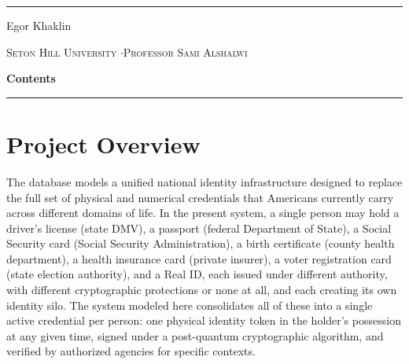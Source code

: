 \documentclass[11pt,letterpaper]{article}
\begin{document}
\begin{titlepage}
\begin{center}
\vspace{0.7in}

{\color{gold}\rule{0.85in}{0.5pt}}

\vspace{0.30in}

{\fontsize{16}{19}\selectfont\color{navydark} Egor Khaklin}

\vfill

{\footnotesize\scshape\color{steelgray}
Seton Hill University \enspace$\cdot$\enspace Professor Sami Alshalwi}

\vspace{0.7in}

\end{center}

\end{titlepage}

\setcounter{page}{1}
\thispagestyle{fancy}
{\color{navydark}\Large\bfseries Contents}\\[2pt]
{\color{navymid}\rule{\textwidth}{0.8pt}}
\vspace{4pt}
\renewcommand{\contentsname}{}
\tableofcontents
\newpage

\setcounter{page}{1}

\section{Project Overview}

The database models a unified national identity infrastructure designed to replace the full set of physical and numerical credentials that Americans currently carry across different domains of life. In the present system, a single person may hold a driver's license (state DMV), a passport (federal Department of State), a Social Security card (Social Security Administration), a birth certificate (county health department), a health insurance card (private insurer), a voter registration card (state election authority), and a Real ID, each issued under different authority, with different cryptographic protections or none at all, and each creating its own identity silo. The system modeled here consolidates all of these into a single active credential per person: one physical identity token in the holder's possession at any given time, signed under a post-quantum cryptographic algorithm, and verified by authorized agencies for specific contexts.
\end{document}
